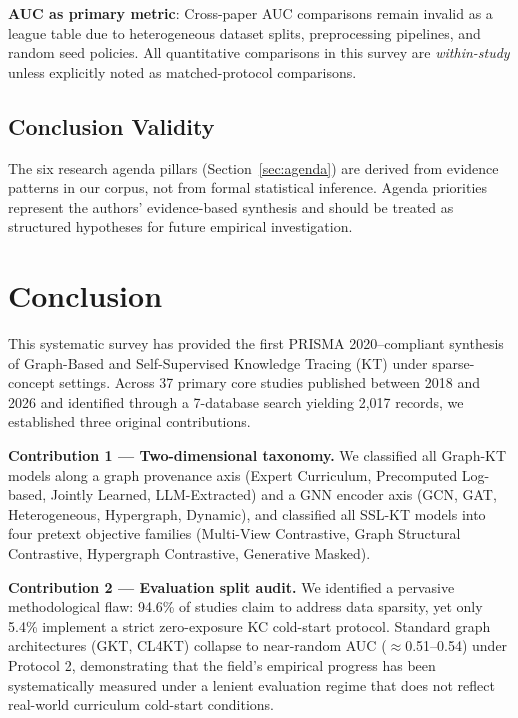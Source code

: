 \documentclass[10pt,journal,compsoc]{IEEEtran}
\begin{document}
\textbf{AUC as primary metric}: Cross-paper AUC comparisons remain invalid as a league table due to heterogeneous dataset splits, preprocessing pipelines, and random seed policies. All quantitative comparisons in this survey are \textit{within-study} unless explicitly noted as matched-protocol comparisons.

\subsection{Conclusion Validity}
The six research agenda pillars (Section~\ref{sec:agenda}) are derived from evidence patterns in our corpus, not from formal statistical inference. Agenda priorities represent the authors' evidence-based synthesis and should be treated as structured hypotheses for future empirical investigation.

\section{Conclusion}
\label{sec:conclusion}

This systematic survey has provided the first PRISMA 2020--compliant synthesis of Graph-Based and Self-Supervised Knowledge Tracing (KT) under sparse-concept settings. Across 37 primary core studies published between 2018 and 2026 and identified through a 7-database search yielding 2,017 records, we established three original contributions.

\textbf{Contribution 1 --- Two-dimensional taxonomy.} We classified all Graph-KT models along a graph provenance axis (Expert Curriculum, Precomputed Log-based, Jointly Learned, LLM-Extracted) and a GNN encoder axis (GCN, GAT, Heterogeneous, Hypergraph, Dynamic), and classified all SSL-KT models into four pretext objective families (Multi-View Contrastive, Graph Structural Contrastive, Hypergraph Contrastive, Generative Masked).

\textbf{Contribution 2 --- Evaluation split audit.} We identified a pervasive methodological flaw: 94.6\% of studies claim to address data sparsity, yet only 5.4\% implement a strict zero-exposure KC cold-start protocol. Standard graph architectures (GKT, CL4KT) collapse to near-random AUC ($\approx$0.51--0.54) under Protocol 2, demonstrating that the field's empirical progress has been systematically measured under a lenient evaluation regime that does not reflect real-world curriculum cold-start conditions.
\end{document}
